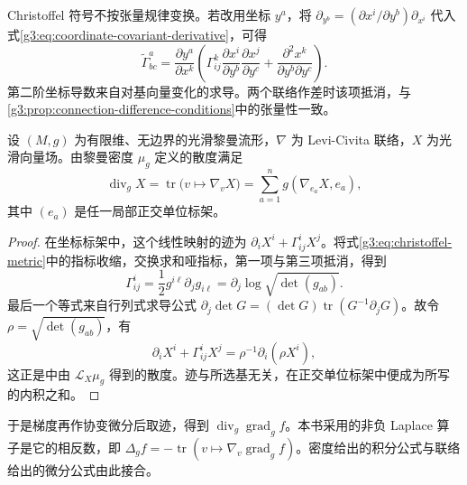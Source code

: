 Christoffel 符号不按张量规律变换。若改用坐标 \(y^a\)，将 \(\partial_{y^b}=(\partial x^i/\partial y^b)\partial_{x^i}\) 代入式\eqref{g3:eq:coordinate-covariant-derivative}，可得
\[
	\widetilde\Gamma^a_{bc}
	=\frac{\partial y^a}{\partial x^k}
	\left(
		\Gamma^k_{ij}\frac{\partial x^i}{\partial y^b}\frac{\partial x^j}{\partial y^c}
		+\frac{\partial^2x^k}{\partial y^b\partial y^c}
	\right).
\]
第二阶坐标导数来自对基向量变化的求导。两个联络作差时该项抵消，与\cref{g3:prop:connection-difference-conditions}中的张量性一致。

\begin{proposition}\label{g3:prop:divergence-connection-trace}
	设 \((M,g)\) 为有限维、无边界的光滑黎曼流形，\(\nabla\) 为 Levi-Civita 联络，\(X\) 为光滑向量场。由黎曼密度 \(\mu_g\) 定义的散度满足
	\[
		\operatorname{div}_gX
		=\operatorname{tr}\bigl(v\mapsto\nabla_vX\bigr)
		=\sum_{a=1}^n g(\nabla_{e_a}X,e_a),
	\]
	其中 \((e_a)\) 是任一局部正交单位标架。
\end{proposition}
\begin{proof}
	在坐标标架中，这个线性映射的迹为 \(\partial_iX^i+\Gamma^i_{ij}X^j\)。将式\eqref{g3:eq:christoffel-metric}中的指标收缩，交换求和哑指标，第一项与第三项抵消，得到
	\[
		\Gamma^i_{ij}=\frac12g^{i\ell}\partial_jg_{i\ell}
		=\partial_j\log\sqrt{\det(g_{ab})}.
	\]
	最后一个等式来自行列式求导公式 \(\partial_j\det G=(\det G)\operatorname{tr}(G^{-1}\partial_jG)\)。故令 \(\rho=\sqrt{\det(g_{ab})}\)，有
	\[
		\partial_iX^i+\Gamma^i_{ij}X^j
		=\rho^{-1}\partial_i(\rho X^i),
	\]
	这正是中由 \(\mathcal L_X\mu_g\) 得到的散度。迹与所选基无关，在正交单位标架中便成为所写的内积之和。
\end{proof}

于是梯度再作协变微分后取迹，得到 \(\operatorname{div}_g\operatorname{grad}_g f\)。本书采用的非负 Laplace 算子是它的相反数，即 \(\Delta_g f=-\operatorname{tr}(v\mapsto\nabla_v\operatorname{grad}_g f)\)。密度给出的积分公式与联络给出的微分公式由此接合。
